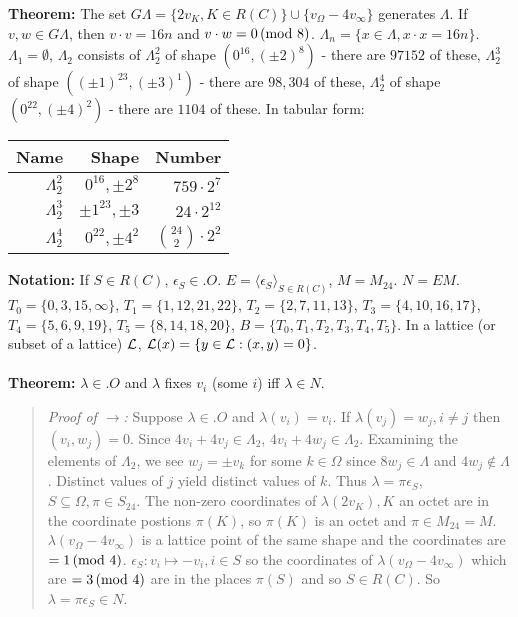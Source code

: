 {\bf Theorem:}
The set $G \Lambda = \{ 2 v_K, K \in R(C) \} \cup
\{ v_{\Omega} - 4 v_{\infty} \}$ generates $\Lambda$.  If $v, w \in G \Lambda$, then
$v \cdot v= 16n$ and $v \cdot w = 0 \thinspace \textnormal{(mod } 8 \textnormal{)}$.  
$\Lambda_n= \{ x  \in \Lambda, x \cdot x = 16n \}$.  $\Lambda_1 = \emptyset$,
$\Lambda_2$ consists of 
$\Lambda_2^2$ of shape $(0^{16}, (\pm 2)^8)$ - there are $97152$ of these,
$\Lambda_2^3$ of shape $((\pm 1)^{23}, (\pm 3)^1)$ - there are $98,304$ of these,
$\Lambda_2^4$ of shape $(0^{22}, (\pm 4)^2)$ - there are $1104$ of these.
In tabular form:
\begin{center}
\begin{tabular} {|r|r|r|}
\hline
{\bf Name} & {\bf Shape} & {\bf Number} \\
\hline
$\Lambda_2^2$ & $0^{16}, \pm 2^8$ & $759 \cdot 2^7$\\
\hline
$\Lambda_2^3$ & $\pm 1^{23}, \pm 3$ & $24 \cdot 2^{12}$\\
\hline
$\Lambda_2^4$ & $0^{22}, \pm 4^2$ & ${24 \choose 2} \cdot 2^2$\\
\hline
\end{tabular}
\end{center}
{\bf Notation:}
If $S \in R(C)$, $\epsilon_S \in .O$.
$E= \langle \epsilon_S \rangle_{S \in R(C)}$, $M= M_{24}$.  $N= EM$.
$T_0= \{0, 3, 15, \infty \}$,
$T_1= \{ 1,12,21,22 \}$,
$T_2= \{ 2,7,11,13 \}$,
$T_3= \{ 4,10,16,17 \}$,
$T_4= \{ 5,6,9,19 \}$,
$T_5= \{ 8, 14,18,20 \}$,
$B= \{ T_0, T_1, T_2, T_3, T_4, T_5 \}$.
In a lattice (or subset of a lattice) ${\cal L}$, ${\cal L}(x) = \{ y \in {\cal L}: (x,y) = 0 \}$.
\\
\\
{\bf Theorem:}
$\lambda \in .O$ and $\lambda$ fixes $v_i$ (some $i$) iff $\lambda \in N$.
\begin{quote}
\emph{Proof of $\rightarrow$:}
Suppose $\lambda \in .O$ and $\lambda(v_i)= v_i$.  If $\lambda(v_j)= w_j, i \ne j$ then
$(v_i, w_j)= 0$.  Since $4 v_i + 4 v_j \in \Lambda_2$,
$4 v_i + 4 w_j \in \Lambda_2$.  Examining the elements of $\Lambda_2$, we see
$w_j= \pm v_k$ for some $k \in \Omega$ since $8w_j \in \Lambda$ and $4w_j \notin \Lambda$.
Distinct values of $j$ yield distinct values of $k$.  Thus $\lambda= \pi \epsilon_S$,
$S \subseteq \Omega, \pi \in S_{24}$.  The non-zero coordinates of
$\lambda( 2 v_K ), K $ an octet are in the coordinate postions $\pi(K)$, so
$\pi(K)$ is an octet and  $\pi \in M_{24}=M$.  $\lambda( v_{\Omega} - 4 v_{\infty})$ is
a lattice point of the same shape and the coordinates are $=1 \thinspace \textnormal{(mod } 4 \textnormal{)}$.
$\epsilon_S: v_i \mapsto -v_i, i \in S$ so the coordinates of
$\lambda( v_{\Omega} - 4 v_{\infty})$ which are $= 3 \thinspace \textnormal{(mod } 4 \textnormal{)}$ are in the places
$\pi(S)$ and so $S \in R(C)$.  So $\lambda = \pi \epsilon_S \in N$.
\end{quote}
